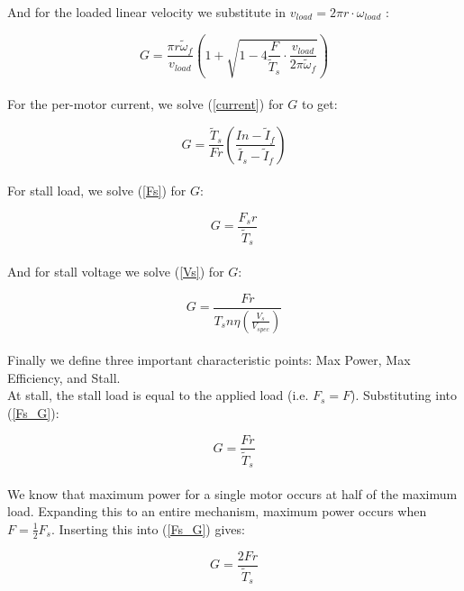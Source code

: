\documentclass[a4paper]{article}
\begin{document}
	And for the loaded linear velocity we substitute in $ v_{load} = 2\pi r \cdot \omega_{load} $ :
	
	\begin{equation}
		G = \frac{\pi r \widetilde{\omega}_f}{v_{load}} \left( 1 + \sqrt{1 - 4 \frac{F}{\widetilde{T}_s} \cdot \frac{v_{load}}{2\pi \widetilde{\omega}_f}} \right)
	\end{equation}\\
	
	For the per-motor current, we solve (\ref{current}) for $ G $ to get:
	
	\begin{equation}
		G = \frac{\widetilde{T}_s}{F r} \left( \frac{I n - \widetilde{I}_f}{\widetilde{I_s} - \widetilde{I}_f} \right)
	\end{equation}\\
	
	For stall load, we solve (\ref{Fs}) for $ G $:
	
	\begin{equation} \label{Fs_G}
		G = \frac{F_s r}{\widetilde{T}_s}
	\end{equation}\\
	
	And for stall voltage we solve (\ref{Vs}) for $ G $:
	
	\begin{equation}
		G = \frac{F r}{T_s n \eta \left( \frac{V_s}{V_{spec}} \right) }
	\end{equation}\\

	Finally we define three important characteristic points: Max Power, Max Efficiency, and Stall.\\
	
	At stall, the stall load is equal to the applied load (i.e. $ F_s = F $). Substituting into (\ref{Fs_G}):
	
	\begin{equation}
		G = \frac{F r}{\widetilde{T}_s}
	\end{equation}\\
	
	We know that maximum power for a single motor occurs at half of the maximum load. Expanding this to an entire mechanism, maximum power occurs when $ F = \frac{1}{2} F_s $. Inserting this into (\ref{Fs_G}) gives:
	
	\begin{equation}
		G = \frac{2 F r}{\widetilde{T}_s}
	\end{equation}\\
	
\end{document}
